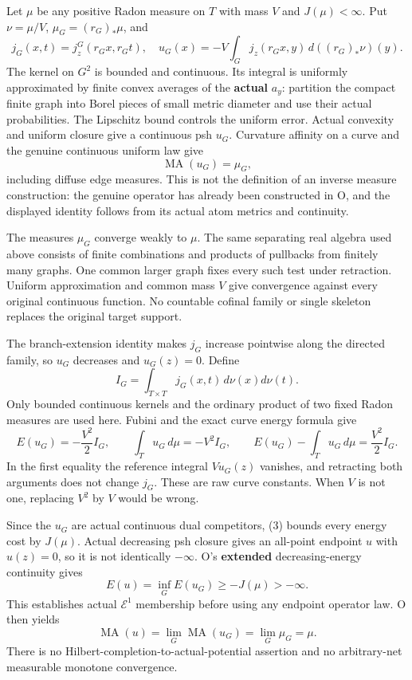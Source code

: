 \documentclass[
  11pt,
]{article}
\begin{document}
Let \(\mu\) be any positive Radon measure on \(T\) with mass \(V\) and
\(J(\mu)<\infty\). Put \(\nu=\mu/V\), \(\mu_G=(r_G)_*\mu\), and \[
 j_G(x,t)=j^G_z(r_Gx,r_Gt),\quad
 u_G(x)=-V\int_G j_z(r_Gx,y)\,d((r_G)_*\nu)(y).
\] The kernel on \(G^2\) is bounded and continuous. Its integral is
uniformly approximated by finite convex averages of the \textbf{actual}
\(a_y\): partition the compact finite graph into Borel pieces of small
metric diameter and use their actual probabilities. The Lipschitz bound
controls the uniform error. Actual convexity and uniform closure give a
continuous psh \(u_G\). Curvature affinity on a curve and the genuine
continuous uniform law give \[
 \operatorname{MA}(u_G)=\mu_G,
\] including diffuse edge measures. This is not the definition of an
inverse measure construction: the genuine operator has already been
constructed in O, and the displayed identity follows from its actual
atom metrics and continuity.

The measures \(\mu_G\) converge weakly to \(\mu\). The same separating
real algebra used above consists of finite combinations and products of
pullbacks from finitely many graphs. One common larger graph fixes every
such test under retraction. Uniform approximation and common mass \(V\)
give convergence against every original continuous function. No
countable cofinal family or single skeleton replaces the original target
support.

The branch-extension identity makes \(j_G\) increase pointwise along the
directed family, so \(u_G\) decreases and \(u_G(z)=0\). Define \[
 I_G=\int_{T\times T}j_G(x,t)\,d\nu(x)d\nu(t).
\] Only bounded continuous kernels and the ordinary product of two fixed
Radon measures are used here. Fubini and the exact curve energy formula
give \[
 E(u_G)=-\frac{V^2}{2}I_G,\qquad
 \int_Tu_G\,d\mu=-V^2I_G,\qquad
 E(u_G)-\int_Tu_G\,d\mu=\frac{V^2}{2}I_G. \tag{3}
\] In the first equality the reference integral \(Vu_G(z)\) vanishes,
and retracting both arguments does not change \(j_G\). These are raw
curve constants. When \(V\) is not one, replacing \(V^2\) by \(V\) would
be wrong.

Since the \(u_G\) are actual continuous dual competitors, (3) bounds
every energy cost by \(J(\mu)\). Actual decreasing psh closure gives an
all-point endpoint \(u\) with \(u(z)=0\), so it is not identically
\(-\infty\). O's \textbf{extended} decreasing-energy continuity gives \[
 E(u)=\inf_GE(u_G)\geq-J(\mu)>-\infty.
\] This establishes actual \(\mathcal E^1\) membership before using any
endpoint operator law. O then yields \[
 \operatorname{MA}(u)=\lim_G\operatorname{MA}(u_G)=\lim_G\mu_G=\mu.
\] There is no Hilbert-completion-to-actual-potential assertion and no
arbitrary-net measurable monotone convergence.
\end{document}
